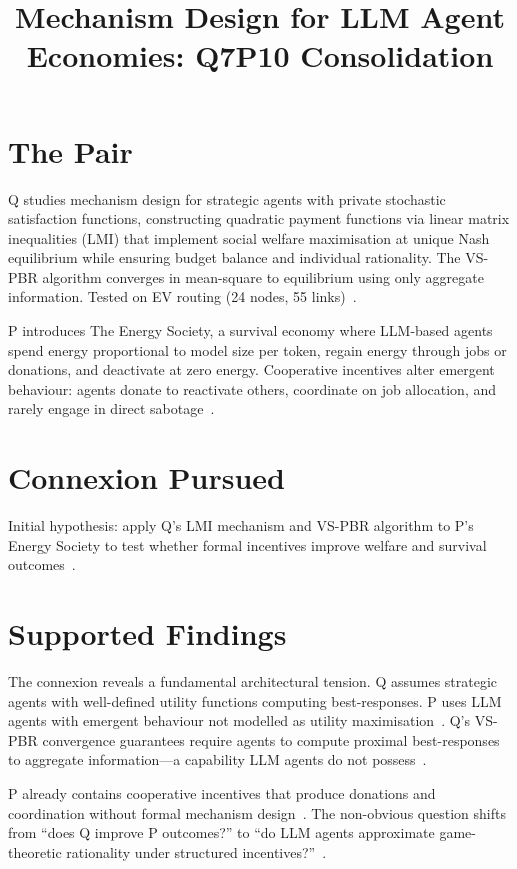 \documentclass{article}
\title{Mechanism Design for LLM Agent Economies: Q7P10 Consolidation}
\begin{document}
\maketitle

\section*{The Pair}

Q studies mechanism design for strategic agents with private stochastic satisfaction functions, constructing quadratic payment functions via linear matrix inequalities (LMI) that implement social welfare maximisation at unique Nash equilibrium while ensuring budget balance and individual rationality. The VS-PBR algorithm converges in mean-square to equilibrium using only aggregate information. Tested on EV routing (24 nodes, 55 links)~.

P introduces The Energy Society, a survival economy where LLM-based agents spend energy proportional to model size per token, regain energy through jobs or donations, and deactivate at zero energy. Cooperative incentives alter emergent behaviour: agents donate to reactivate others, coordinate on job allocation, and rarely engage in direct sabotage~.

\section*{Connexion Pursued}

Initial hypothesis: apply Q's LMI mechanism and VS-PBR algorithm to P's Energy Society to test whether formal incentives improve welfare and survival outcomes~.

\section*{Supported Findings}

The connexion reveals a fundamental architectural tension. Q assumes strategic agents with well-defined utility functions computing best-responses. P uses LLM agents with emergent behaviour not modelled as utility maximisation~. Q's VS-PBR convergence guarantees require agents to compute proximal best-responses to aggregate information---a capability LLM agents do not possess~.

P already contains cooperative incentives that produce donations and coordination without formal mechanism design~. The non-obvious question shifts from ``does Q improve P outcomes?'' to ``do LLM agents approximate game-theoretic rationality under structured incentives?''~.
\end{document}
